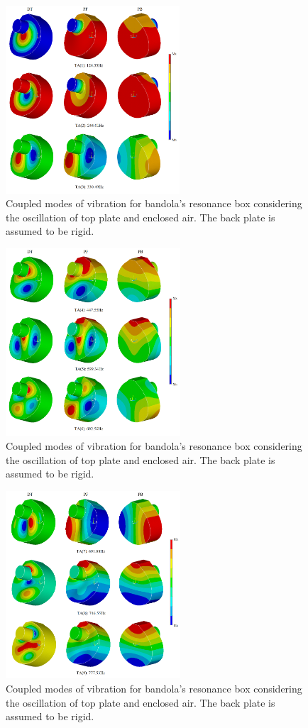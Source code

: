 \begin{figure}[h]
\centering
\includegraphics[height=7cm]{img/CoupledModes2a.png}
\caption{Coupled modes of vibration for bandola's resonance box considering the oscillation of top plate and enclosed air. The back plate is assumed to be rigid.}
\label{CoupledModes2a}
\end{figure}

\begin{figure}[h]
\centering
\includegraphics[height=7cm]{img/CoupledModes2b.png}
\caption{Coupled modes of vibration for bandola's resonance box considering the oscillation of top plate and enclosed air. The back plate is assumed to be rigid.}
\label{CoupledModes2b}
\end{figure}

\begin{figure}[h]
\centering
\includegraphics[height=7cm]{img/CoupledModes2c.png}
\caption{Coupled modes of vibration for bandola's resonance box considering the oscillation of top plate and enclosed air. The back plate is assumed to be rigid.}
\label{CoupledModes2c}
\end{figure}


